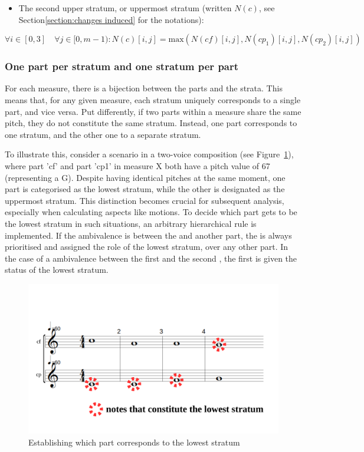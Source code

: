 \begin{itemize}
    \item The second upper stratum, or uppermost stratum (written $N(c)$, see Section\ref{section:changes induced} for the notations):
\end{itemize}   
\begin{equation}
    \forall i \in [0, 3] \quad \forall j \in [0, m-1): N(c)[i,j] = \text{max} (N(\mathit{cf})[i,j], N(cp_1)[i,j], N(cp_2)[i,j])
\end{equation}

\subsubsection{One part per stratum and one stratum per part} \label{subsubsection:one-part-per-stratum}
For each measure, there is a bijection between the parts and the strata. This means that, for any given measure, each stratum uniquely corresponds to a single part, and vice versa. Put differently, if two parts within a measure share the same pitch, they do not constitute the same stratum. Instead, one part corresponds to one stratum, and the other one to a separate stratum.

To illustrate this, consider a scenario in a two-voice composition (see Figure~\ref{fig:one-voice-max-can-be-a}), where part 'cf' and part 'cp1' in measure X both have a pitch value of 67 (representing a G). Despite having identical pitches at the same moment, one part is categorised as the lowest stratum, while the other is designated as the uppermost stratum. This distinction becomes crucial for subsequent analysis, especially when calculating aspects like motions.
To decide which part gets to be the lowest stratum in such situations, an arbitrary hierarchical rule is implemented. If the ambivalence is between the \cfs and another part, the \cfs is always prioritised and assigned the role of the lowest stratum, over any other part. In the case of a ambivalence between the first \cps and the second \cp, the first \cps is given the status of the lowest stratum. 

\begin{figure}[h]
    \centering
    \includegraphics[width=.5\textwidth]{Images/one-voice-max-can-be-a.png}
    \caption{Establishing which part corresponds to the lowest stratum}
    \label{fig:one-voice-max-can-be-a}
  \end{figure}

